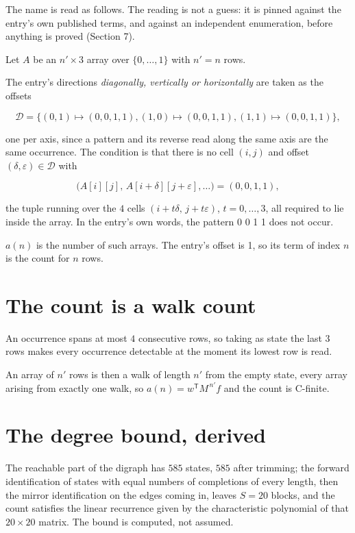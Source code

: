\documentclass[11pt]{article}
\theoremstyle{definition}
\begin{document}
The name is read as follows. The reading is not a guess: it is pinned against the entry's own published terms, and against an independent enumeration, before anything is proved (Section 7).

Let $A$ be an $n' \times 3$ array over $\{0,\dots,1\}$ with $n' = n$ rows.

The entry's directions {\itshape diagonally, vertically or horizontally} are taken as the offsets

\[\mathcal{D} = \{(0,1)\mapsto(0,0,1,1), (1,0)\mapsto(0,0,1,1), (1,1)\mapsto(0,0,1,1)\},\]

one per axis, since a pattern and its reverse read along the same axis are the same occurrence. The condition is that there is no cell $(i,j)$ and offset $(\delta,\varepsilon)\in\mathcal{D}$ with

\[\bigl(A[i][j],\,A[i{+}\delta][j{+}\varepsilon],\dots\bigr) = (0, 0, 1, 1),\]

the tuple running over the $4$ cells $(i+t\delta,\,j+t\varepsilon)$, $t = 0,\dots,3$, all required to lie inside the array. In the entry's own words, the pattern 0 0 1 1 does not occur.

$a(n)$ is the number of such arrays. The entry's offset is 1, so its term of index $n$ is the count for $n$ rows.

\section{The count is a walk count}

An occurrence spans at most $4$ consecutive rows, so taking as state the last $3$ rows makes every occurrence detectable at the moment its lowest row is read.

An array of $n'$ rows is then a walk of length $n'$ from the empty state, every array arising from exactly one walk, so $a(n) = w^{\mathsf T}M^{\,n'}f$ and the count is C-finite.

\section{The degree bound, derived}

The reachable part of the digraph has $585$ states, $585$ after trimming; the forward identification of states with equal numbers of completions of every length, then the mirror identification on the edges coming in, leaves $S = 20$ blocks, and the count satisfies the linear recurrence given by the characteristic polynomial of that $20\times20$ matrix. The bound is computed, not assumed.
\end{document}
